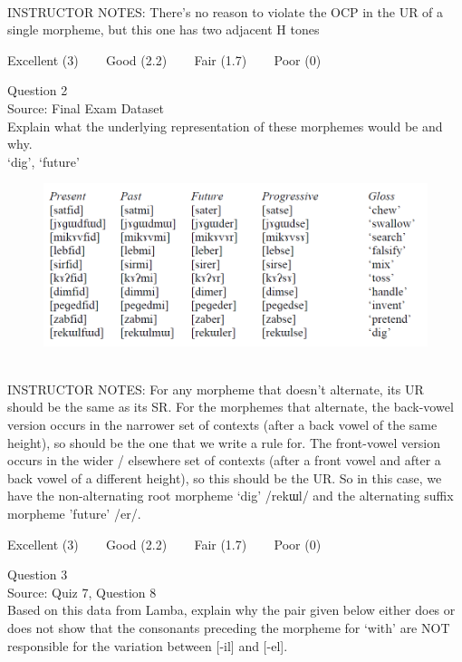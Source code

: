 \documentclass[12pt]{article}
\begin{document}
~\\
INSTRUCTOR NOTES: There's no reason to violate the OCP in the UR of a single morpheme, but this one has two adjacent H tones


\vfill
Excellent (3) ~~~ Good (2.2) ~~~ Fair (1.7) ~~~ Poor (0)
\newpage

{\large Question 2}\\

Source: Final Exam Dataset\\

Explain what the underlying representation of these morphemes would be and why.\\

`dig', `future'

\begin{figure}[H]
\includegraphics{../images/final_dataset.png}
\end{figure}

~\\
INSTRUCTOR NOTES: For any morpheme that doesn’t alternate, its UR should be the same as its SR.  For the morphemes that alternate, the back-vowel version occurs in the narrower set of contexts (after a back vowel of the same height), so should be the one that we write a rule for. The front-vowel version occurs in the wider / elsewhere set of contexts (after a front vowel and after a back vowel of a different height), so this should be the UR. So in this case, we have the non-alternating root morpheme ‘dig’ /rekɯl/ and the alternating suffix morpheme 'future' /er/.


\vfill
Excellent (3) ~~~ Good (2.2) ~~~ Fair (1.7) ~~~ Poor (0)
\newpage

{\large Question 3}\\

Source: Quiz 7, Question 8\\

Based on this data from Lamba, explain why the pair given below either does or does not show that the consonants preceding the morpheme for `with' are NOT responsible for the variation between [-il] and [-el].\\
\end{document}
